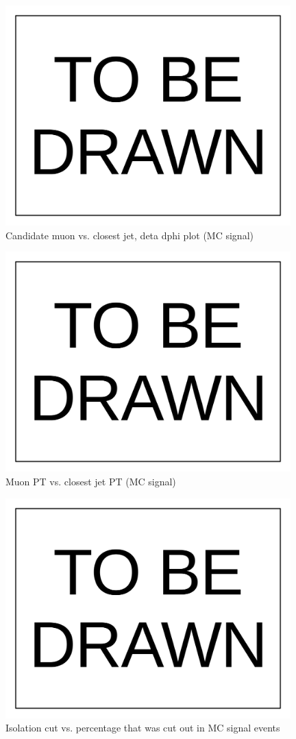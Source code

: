 \documentclass[10pt,a4paper,onecolumn]{article}
\begin{document}
\begin{figure}
\includegraphics[width=110mm]{ToBeDrawn.pdf}
\caption{Candidate muon vs. closest jet, deta dphi plot (MC signal)}
\label{Figure_CandidateMuonVsClosestJetEtaPhi}
\end{figure}

\begin{figure}
\includegraphics[width=110mm]{ToBeDrawn.pdf}
\caption{Muon PT vs. closest jet PT (MC signal)}
\label{Figure_CandidateMuonVsClosestJetPT}
\end{figure}

\begin{figure}
\includegraphics[width=110mm]{ToBeDrawn.pdf}
\caption{Isolation cut vs. percentage that was cut out in MC signal events}
\label{Figure_IsolationCutVsRejectionPercentage}
\end{figure}
\end{document}
